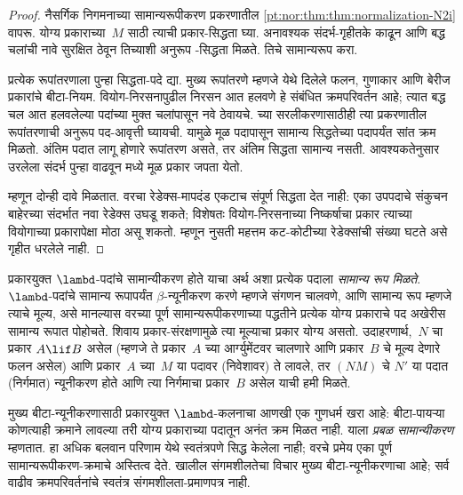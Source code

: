 \begin{proof}
  नैसर्गिक निगमनाच्या सामान्यरूपीकरण प्रकरणातील
  \ref{pt:nor:thm:thm:normalization-N2i} वापरू.
  योग्य प्रकाराच्या~$M$ साठी त्याची प्रकार-सिद्धता घ्या.
  अनावश्यक संदर्भ-गृहीतके काढून आणि बद्ध चलांची नावे
  सुरक्षित ठेवून तिच्याशी अनुरूप -सिद्धता
  मिळते. तिचे सामान्यरूप करा.

  प्रत्येक रूपांतरणाला पुन्हा सिद्धता-पदे द्या. मुख्य
  रूपांतरणे म्हणजे येथे दिलेले फलन, गुणाकार आणि बेरीज
  प्रकारांचे बीटा-नियम. वियोग-निरसनापुढील निरसन आत
  हलवणे हे संबंधित क्रमपरिवर्तन आहे; त्यात बद्ध चल
  आत हलवलेल्या पदांच्या मुक्त चलांपासून नवे ठेवायचे.
  \FalseInt{} च्या सरलीकरणासाठीही त्या प्रकरणातील
  रूपांतरणाची अनुरूप पद-आवृत्ती घ्यायची. यामुळे मूळ
  पदापासून सामान्य सिद्धतेच्या पदापर्यंत सांत क्रम मिळतो.
  अंतिम पदात लागू होणारे रूपांतरण असते, तर अंतिम
  सिद्धता सामान्य नसती. आवश्यकतेनुसार उरलेला संदर्भ
  पुन्हा वाढवून  मध्ये मूळ प्रकार जपता येतो.

  म्हणून दोन्ही दावे मिळतात. वरचा रेडेक्स-मापदंड
  एकटाच संपूर्ण सिद्धता देत नाही: एका उपपदाचे संकुचन
  बाहेरच्या संदर्भात नवा रेडेक्स उघडू शकते; विशेषतः
  वियोग-निरसनाच्या निष्कर्षाचा प्रकार त्याच्या वियोगाच्या
  प्रकारापेक्षा मोठा असू शकतो. म्हणून नुसती महत्तम
  कट-कोटीच्या रेडेक्सांची संख्या घटते असे गृहीत धरलेले नाही.
\end{proof}

प्रकारयुक्त $\lambd$-पदांचे सामान्यीकरण होते याचा अर्थ
अशा प्रत्येक पदाला \emph{सामान्य रूप मिळते}. $\lambd$-पदांचे
सामान्य रूपापर्यंत $\beta$-न्यूनीकरण करणे म्हणजे संगणन चालवणे,
आणि सामान्य रूप म्हणजे त्याचे मूल्य, असे मानल्यास वरच्या पूर्ण सामान्यरूपीकरणाच्या पद्धतीने प्रत्येक
योग्य प्रकाराचे पद अखेरीस सामान्य रूपात पोहोचते.
शिवाय प्रकार-संरक्षणामुळे त्या मूल्याचा प्रकार योग्य असतो.
उदाहरणार्थ,~$N$ चा प्रकार $A \lif B$ असेल
(म्हणजे ते प्रकार~$A$ च्या आर्ग्युमेंटवर चालणारे आणि
प्रकार~$B$ चे मूल्य देणारे फलन असेल) आणि प्रकार~$A$
च्या~$M$ या पदावर (निवेशावर) ते लावले, तर $(NM)$ चे
$N'$ या पदात (निर्गमात) न्यूनीकरण होते आणि त्या निर्गमाचा
प्रकार~$B$ असेल याची हमी मिळते.

मुख्य बीटा-न्यूनीकरणासाठी प्रकारयुक्त $\lambd$-कलनाचा
आणखी एक गुणधर्म खरा आहे: बीटा-पायऱ्या कोणत्याही क्रमाने
लावल्या तरी योग्य प्रकाराच्या पदातून अनंत क्रम मिळत नाही.
याला \emph{प्रबळ सामान्यीकरण} म्हणतात. हा अधिक बलवान
परिणाम येथे स्वतंत्रपणे सिद्ध केलेला नाही; वरचे प्रमेय
एका पूर्ण सामान्यरूपीकरण-क्रमाचे अस्तित्व देते.
खालील संगमशीलतेचा विचार मुख्य बीटा-न्यूनीकरणाचा आहे;
सर्व वाढीव क्रमपरिवर्तनांचे स्वतंत्र संगमशीलता-प्रमाणपत्र नाही.

